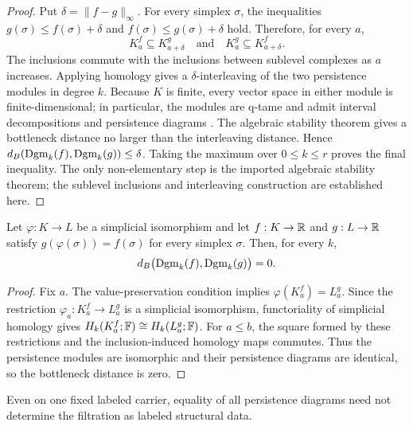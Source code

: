 \begin{proof}
Put $\delta=\|f-g\|_\infty$. For every simplex $\sigma$, the inequalities
$g(\sigma)\leq f(\sigma)+\delta$ and
$f(\sigma)\leq g(\sigma)+\delta$ hold. Therefore, for every $a$,
\[
 K_a^f\subseteq K_{a+\delta}^g
 \quad\text{and}\quad
 K_a^g\subseteq K_{a+\delta}^f.
\]
The inclusions commute with the inclusions between sublevel complexes as $a$
increases. Applying homology gives a $\delta$-interleaving of the two
persistence modules in degree $k$. Because $K$ is finite, every vector space
in either module is finite-dimensional; in particular, the modules are
q-tame and admit interval decompositions and persistence diagrams
\cite{crawleyboevey2015decomposition}. The algebraic stability theorem
\cite{chazal2009proximity,bauerlesnick2015induced} gives a bottleneck distance no larger than
the interleaving distance. Hence $d_B(\operatorname{Dgm}_k(f),\operatorname{Dgm}_k(g))\leq\delta$.
Taking the maximum over $0\leq k\leq r$ proves the final inequality. The
only non-elementary step is the imported algebraic stability theorem; the
sublevel inclusions and interleaving construction are established here.
\end{proof}

\begin{proposition}
Let $\varphi:K\to L$ be a simplicial isomorphism and let $f:K\to\mathbb{R}$ and
$g:L\to\mathbb{R}$ satisfy $g(\varphi(\sigma))=f(\sigma)$ for every simplex
$\sigma$. Then, for every $k$,
\[
 d_B\bigl(\operatorname{Dgm}_k(f),\operatorname{Dgm}_k(g)\bigr)=0.
\]
\end{proposition}

\begin{proof}
Fix $a$. The value-preservation condition implies
$\varphi(K_a^f)=L_a^g$. Since the restriction
$\varphi_a:K_a^f\to L_a^g$ is a simplicial isomorphism, functoriality of
simplicial homology gives $H_k(K_a^f;\mathbb{F})\cong H_k(L_a^g;\mathbb{F})$. For
$a\leq b$, the square formed by these restrictions and the inclusion-induced
homology maps commutes. Thus the persistence modules are isomorphic and their
persistence diagrams are identical, so the bottleneck distance is zero.
\end{proof}

\begin{proposition}
Even on one fixed labeled carrier, equality of all persistence diagrams need
not determine the filtration as labeled structural data.
\end{proposition}

